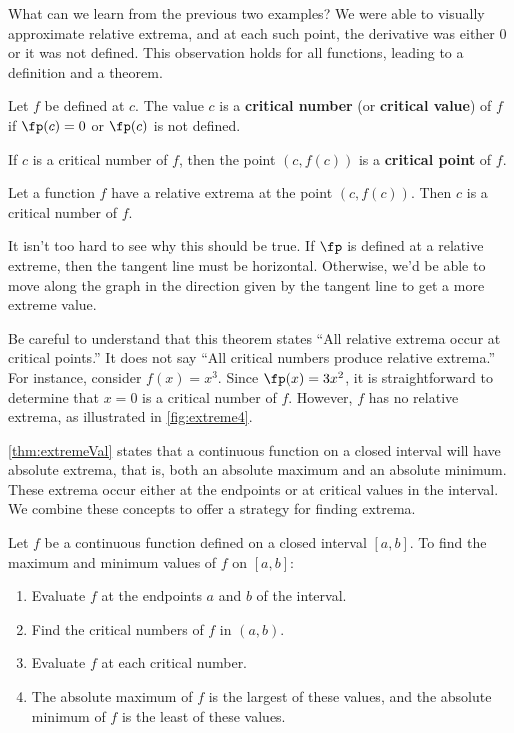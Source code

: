 What can we learn from the previous two examples? We were able to visually approximate relative extrema, and at each such point, the derivative was either 0 or it was not defined. This observation holds for all functions, leading to a definition and a theorem.

%
{Let $f$ be defined at $c$. The value $c$ is a \textbf{critical number} (or \textbf{critical value}) of $f$ if $\fp(c)=0$ or $\fp(c)$ is not defined.\bigskip

If $c$ is a critical number of $f$, then the point $(c,f(c))$ is a \textbf{critical point} of $f$.}

{Let a function $f$ have a relative extrema at the point $(c,f(c))$. Then $c$ is a critical number of $f$.}%

It isn't too hard to see why this should be true.  If $\fp$ is defined at a relative extreme, then the tangent line must be horizontal.  Otherwise, we'd be able to move along the graph in the direction given by the tangent line to get a more extreme value.



Be careful to understand that this theorem states  ``All relative extrema occur at critical points.'' It does not say ``All critical numbers produce relative extrema.'' For instance, consider $f(x) = x^3$. Since $\fp(x) = 3x^2$, it is straightforward to determine that $x=0$ is a critical number of $f$. However, $f$ has no relative extrema, as illustrated in \autoref{fig:extreme4}.\bigskip

\autoref{thm:extremeVal} states that a continuous function on a closed interval will have absolute extrema, that is, both an absolute maximum and an absolute minimum. These extrema occur either at the endpoints or at critical values in the interval. We combine these concepts to offer a strategy for finding extrema.

%
{Let $f$ be a continuous function defined on a closed interval $[a,b]$. To find the maximum and minimum values of $f$ on $[a,b]$:
	\begin{enumerate}
	\item		Evaluate $f$ at the endpoints $a$ and $b$ of the interval.
	\item		Find the critical numbers of $f$ in $(a,b)$.
	\item		Evaluate $f$ at each critical number.
	\item		The absolute maximum of $f$ is the largest of these values, and the absolute minimum of $f$ is the least of these values.
	\end{enumerate}}

